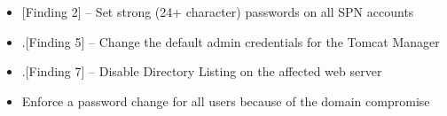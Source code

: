 \begin{itemize}
\item {[Finding 2] – Set strong (24+ character) passwords on all SPN accounts}
\item .[Finding 5] – Change the default admin credentials for the Tomcat Manager
\item .[Finding 7] – Disable Directory Listing on the affected web server
\item Enforce a password change for all users because of the domain compromise
\end{itemize}